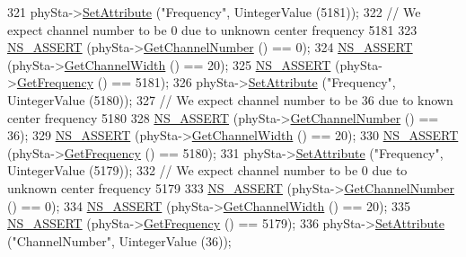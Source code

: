 \begin{DoxyCode}
321       phySta->\hyperlink{classns3_1_1ObjectBase_ac60245d3ea4123bbc9b1d391f1f6592f}{SetAttribute} (\textcolor{stringliteral}{"Frequency"}, UintegerValue (5181));
322       \textcolor{comment}{// We expect channel number to be 0 due to unknown center frequency 5181}
323       \hyperlink{assert_8h_a6dccdb0de9b252f60088ce281c49d052}{NS\_ASSERT} (phySta->\hyperlink{classns3_1_1WifiPhy_a5cf0ccf06109ace61db51c83e91b7e8d}{GetChannelNumber} () == 0);
324       \hyperlink{assert_8h_a6dccdb0de9b252f60088ce281c49d052}{NS\_ASSERT} (phySta->\hyperlink{classns3_1_1WifiPhy_a4a5d5009b3b3308f2baeed42a2007189}{GetChannelWidth} () == 20);
325       \hyperlink{assert_8h_a6dccdb0de9b252f60088ce281c49d052}{NS\_ASSERT} (phySta->\hyperlink{classns3_1_1WifiPhy_ad2508d94faf22d690d6b8b4367934fd1}{GetFrequency} () == 5181);
326       phySta->\hyperlink{classns3_1_1ObjectBase_ac60245d3ea4123bbc9b1d391f1f6592f}{SetAttribute} (\textcolor{stringliteral}{"Frequency"}, UintegerValue (5180));
327       \textcolor{comment}{// We expect channel number to be 36 due to known center frequency 5180}
328       \hyperlink{assert_8h_a6dccdb0de9b252f60088ce281c49d052}{NS\_ASSERT} (phySta->\hyperlink{classns3_1_1WifiPhy_a5cf0ccf06109ace61db51c83e91b7e8d}{GetChannelNumber} () == 36);
329       \hyperlink{assert_8h_a6dccdb0de9b252f60088ce281c49d052}{NS\_ASSERT} (phySta->\hyperlink{classns3_1_1WifiPhy_a4a5d5009b3b3308f2baeed42a2007189}{GetChannelWidth} () == 20);
330       \hyperlink{assert_8h_a6dccdb0de9b252f60088ce281c49d052}{NS\_ASSERT} (phySta->\hyperlink{classns3_1_1WifiPhy_ad2508d94faf22d690d6b8b4367934fd1}{GetFrequency} () == 5180);
331       phySta->\hyperlink{classns3_1_1ObjectBase_ac60245d3ea4123bbc9b1d391f1f6592f}{SetAttribute} (\textcolor{stringliteral}{"Frequency"}, UintegerValue (5179));
332       \textcolor{comment}{// We expect channel number to be 0 due to unknown center frequency 5179}
333       \hyperlink{assert_8h_a6dccdb0de9b252f60088ce281c49d052}{NS\_ASSERT} (phySta->\hyperlink{classns3_1_1WifiPhy_a5cf0ccf06109ace61db51c83e91b7e8d}{GetChannelNumber} () == 0);
334       \hyperlink{assert_8h_a6dccdb0de9b252f60088ce281c49d052}{NS\_ASSERT} (phySta->\hyperlink{classns3_1_1WifiPhy_a4a5d5009b3b3308f2baeed42a2007189}{GetChannelWidth} () == 20);
335       \hyperlink{assert_8h_a6dccdb0de9b252f60088ce281c49d052}{NS\_ASSERT} (phySta->\hyperlink{classns3_1_1WifiPhy_ad2508d94faf22d690d6b8b4367934fd1}{GetFrequency} () == 5179);
336       phySta->\hyperlink{classns3_1_1ObjectBase_ac60245d3ea4123bbc9b1d391f1f6592f}{SetAttribute} (\textcolor{stringliteral}{"ChannelNumber"}, UintegerValue (36));

\end{DoxyCode}
